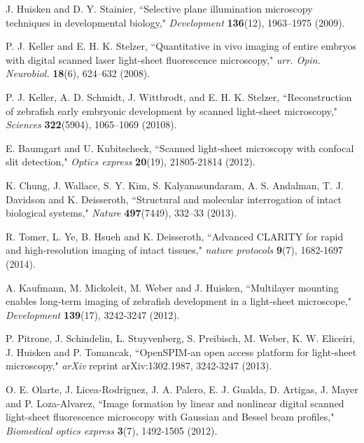 \documentclass[12pt]{spieman}  %
\begin{document}
\begin{thebibliography}{0}

 J. Huisken and D. Y. Stainier, ``Selective plane illumination microscopy techniques in developmental biology," \emph{Development} \textbf{136}(12), 1963–1975 (2009).

 P. J. Keller and E. H. K. Stelzer, ``Quantitative in vivo imaging of entire embryos with digital scanned laser light-sheet fluorescence microscopy," \emph{urr. Opin. Neurobiol.} \textbf{18}(6), 624–632 (2008).

 P. J. Keller, A. D. Schmidt, J. Wittbrodt, and E. H. K. Stelzer, ``Reconstruction of zebrafish early embryonic development by scanned light-sheet microscopy," \emph{Sciences} \textbf{322}(5904), 1065–1069 (20108).

 E. Baumgart and U. Kubitscheck, ``Scanned light-sheet microscopy with confocal slit detection," \emph{Optics express} \textbf{20}(19), 21805-21814 (2012).

 K. Chung, J. Wallace, S. Y. Kim, S. Kalyanasundaram, A. S. Andalman, T. J. Davidson and K. Deisseroth, ``Structural and molecular interrogation of intact biological systems," \emph{Nature} \textbf{497}(7449), 332–33 (2013).

 R. Tomer, L. Ye, B. Hsueh and K. Deisseroth, ``Advanced CLARITY for rapid and high-resolution imaging of intact tissues," \emph{nature protocols} \textbf{9}(7), 1682-1697 (2014).

 A. Kaufmann, M. Mickoleit, M. Weber and J. Huisken, ``Multilayer mounting enables long-term imaging of zebrafish development in a light-sheet microscope," \emph{Development} \textbf{139}(17), 3242-3247 (2012).

 P. Pitrone, J. Schindelin, L. Stuyvenberg, S. Preibisch, M. Weber, K. W. Eliceiri, J. Huisken and P. Tomancak, ``OpenSPIM-an open access platform for light-sheet microscopy," \emph{arXiv} reprint arXiv:1302.1987, 3242-3247 (2013).

 O. E. Olarte, J. Licea-Rodriguez, J. A. Palero, E. J. Gualda, D. Artigas, J. Mayer and P. Loza-Alvarez, ``Image formation by linear and nonlinear digital scanned light-sheet fluorescence microscopy with Gaussian and Bessel beam profiles," \emph{Biomedical optics express} \textbf{3}(7), 1492-1505 (2012).


\end{thebibliography}
\end{document}

